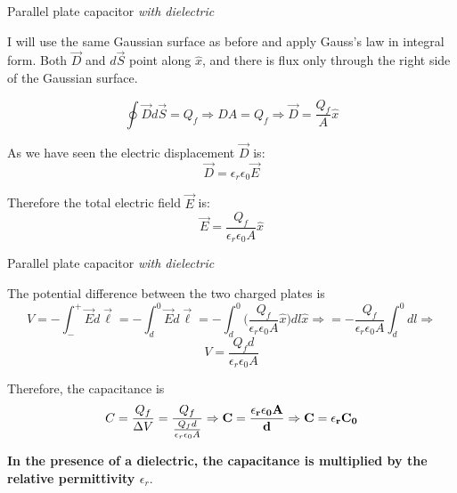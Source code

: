 %
%
%

\begin{frame}{Parallel plate capacitor {\em with dielectric}}

I will use the same Gaussian surface as before and apply Gauss's law in integral form.
Both $\vec{D}$ and $d\vec{S}$ point along $\hat{x}$,
and there is flux only through the right side of the Gaussian surface.

\begin{equation*}
   \oint \vec{D} d\vec{S} = Q_{f} \Rightarrow D A = Q_{f} \Rightarrow \vec{D} = \frac{Q_{f}}{A} \hat{x}
\end{equation*}

As we have seen the electric displacement $\vec{D}$ is:
\begin{equation*}
   \vec{D} = \epsilon_{r} \epsilon_{0} \vec{E}
\end{equation*}

Therefore the total electric field $\vec{E}$ is:
\begin{equation*}
   \vec{E} = \frac{Q_{f}}{\epsilon_{r} \epsilon_{0} A} \hat{x}
\end{equation*}

\end{frame}

%
%
%

\begin{frame}{Parallel plate capacitor {\em with dielectric}}

The potential difference between the two charged plates is
\begin{equation*}
    V = - \int_{-}^{+} \vec{E} d\vec{\ell} =  - \int_{d}^{0} \vec{E} d\vec{\ell}
      = - \int_{d}^{0} \Big( \frac{Q_{f}}{\epsilon_{r} \epsilon_{0} A} \hat{x} \Big) dl \hat{x} \Rightarrow
      = - \frac{Q_{f}}{\epsilon_{r} \epsilon_{0} A} \int_{d}^{0} dl \Rightarrow
\end{equation*}
\begin{equation*}
    V = \frac{Q_{f} d}{\epsilon_{r} \epsilon_{0} A}
\end{equation*}

Therefore, the capacitance is
\begin{equation*}
       C = \frac{Q_{f}}{{\Delta}V} = \frac{Q_{f}}{\frac{Q_{f} d}{\epsilon_{r} \epsilon_{0} A}} \Rightarrow
  {\bf C = \frac{\epsilon_{r} \epsilon_{0} A}{d} } \Rightarrow
  {\bf C = \epsilon_{r} C_{0}}
\end{equation*}

{\bf In the presence of a dielectric,
the capacitance is multiplied by the relative permittivity $\epsilon_{r}$}.\\

\end{frame}



